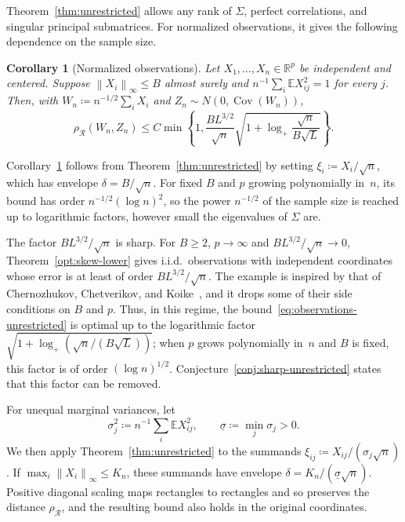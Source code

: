 \documentclass[11pt,letterpaper]{article}
\newtheorem{corollary}{Corollary}
\theoremstyle{remark}
\newcommand{\E}{\mathbb E}
\newcommand{\R}{\mathbb R}
\newcommand{\Cov}{\operatorname{Cov}}
\newcommand{\norm}[1]{\left\lVert#1\right\rVert}
\newcommand{\rh}{\rho_{\mathcal R}}
\begin{document}
Theorem~\ref{thm:unrestricted} allows any rank of \(\Sigma\), perfect
correlations, and singular principal submatrices. For normalized
observations, it gives the following dependence on the sample size.

\begin{corollary}[Normalized observations]\label{cor:observations}
Let \(X_1,\ldots,X_n\in\R^p\) be independent and centered. Suppose
\(\norm{X_i}_\infty\le B\) almost surely and
\(n^{-1}\sum_i\E X_{ij}^2=1\) for every \(j\). Then, with
\(W_n\coloneqq n^{-1/2}\sum_iX_i\) and \(Z_n\sim N(0,\Cov(W_n))\),
\begin{equation}
 \rh(W_n,Z_n)\le C\min\!\left\{1,
 \frac{B L^{3/2}}{\sqrt n}
 \sqrt{1+\log_+\frac{\sqrt n}{B\sqrt L}}\right\}.
 \label{eq:observations-unrestricted}
\end{equation}
\end{corollary}

Corollary~\ref{cor:observations} follows from Theorem~\ref{thm:unrestricted}
by setting \(\xi_i\coloneqq X_i/\sqrt n\), which has envelope \(\delta=B/\sqrt n\). For
fixed \(B\) and \(p\) growing polynomially in~\(n\), its bound has
order \(n^{-1/2}(\log n)^2\), so the power \(n^{-1/2}\) of the
sample size is reached up to logarithmic factors, however small the
eigenvalues of \(\Sigma\) are.

The factor \(BL^{3/2}/\sqrt n\) is sharp. For \(B\ge2\), \(p\to\infty\) and
\(BL^{3/2}/\sqrt n\to0\), Theorem~\ref{opt:skew-lower} gives i.i.d.\ observations
with independent coordinates whose error is at least of order
\(BL^{3/2}/\sqrt n\). The example is inspired by that of Chernozhukov,
Chetverikov, and Koike~\cite[Proposition~2.1]{CCK}, and it drops some of their
side conditions on \(B\) and \(p\). Thus, in this regime, the
bound~\eqref{eq:observations-unrestricted} is optimal up to the logarithmic
factor \(\sqrt{1+\log_+(\sqrt n/(B\sqrt L))}\); when \(p\) grows polynomially
in~\(n\) and \(B\) is fixed, this factor is of order \((\log n)^{1/2}\).
Conjecture~\ref{conj:sharp-unrestricted} states that this factor can be removed.

For unequal marginal variances, let
\[
 \sigma_j^2\coloneqq n^{-1}\sum_i\E X_{ij}^2,
 \qquad
 \underline\sigma\coloneqq \min_j\sigma_j>0.
\]
We then apply Theorem~\ref{thm:unrestricted} to the summands
\(\xi_{ij}\coloneqq X_{ij}/(\sigma_j\sqrt n)\). If
\(\max_i\norm{X_i}_\infty\le K_n\), these summands have
envelope \(\delta=K_n/(\underline\sigma\sqrt n)\).
Positive diagonal scaling maps rectangles to rectangles and so preserves
the distance \(\rh\), and the resulting bound also holds in the
original coordinates.
\end{document}
